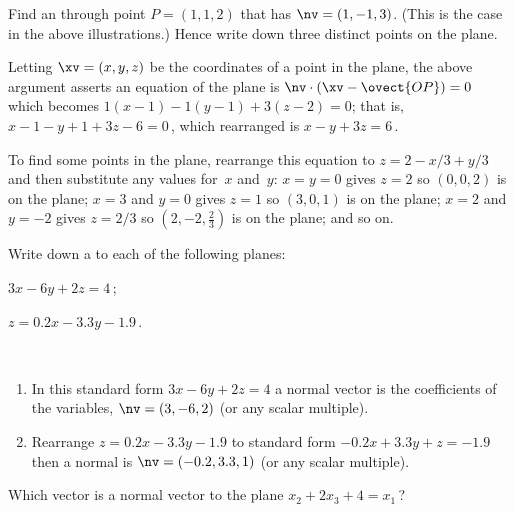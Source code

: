 \begin{example} 
Find an  through point \(P=(1,1,2)\) that has  \(\nv=(1,-1,3)\).
(This is the case in the above illustrations.)
Hence write down three distinct points on the plane.
\begin{solution} 
Letting \(\xv=(x,y,z)\) be the coordinates of a point in the plane, the above argument asserts an equation of the plane is \(\nv\cdot(\xv-\ovect{OP})=0\) which becomes
\(1(x-1)-1(y-1)+3(z-2)=0\); that is, \(x-1-y+1+3z-6=0\)\,, which rearranged is \(x-y+3z=6\)\,. 

To find some points in the plane, rearrange this equation to \(z=2-x/3+y/3\) and then substitute any values for~\(x\) and~\(y\):  
\(x=y=0\) gives \(z=2\) so \((0,0,2)\) is on the plane; 
\(x=3\) and \(y=0\) gives \(z=1\) so \((3,0,1)\) is on the plane;
\(x=2\) and \(y=-2\) gives \(z=2/3\) so \((2,-2,\frac23)\) is on the plane; and so on.
\end{solution}
\end{example}





\begin{reduce}
\begin{example} 
Write down a  to each of the following planes:
\begin{Parts}
\item \(3x-6y+2z=4\)\,;
\item \(z=0.2x-3.3y-1.9\)\,.
\end{Parts}
\begin{solution} \ 
\begin{enumerate}
\item In this standard form \(3x-6y+2z=4\) a normal vector is the coefficients of the variables, \(\nv=(3,-6,2)\) (or any scalar multiple).
\item Rearrange \(z=0.2x-3.3y-1.9\) to standard form \(-0.2x+3.3y+z=-1.9\) then a normal is \(\nv=(-0.2,3.3,1)\) (or any scalar multiple).
\end{enumerate} 
\end{solution}
\end{example}
\end{reduce}




\begin{activity}
Which vector is a normal vector to the plane \(x_2+2x_3+4=x_1\)\,?
\actposs[4]{\((-1,1,2)\)}{\((1,2,1)\)}{\((1,2,4)\)}{none of these}
\end{activity}




